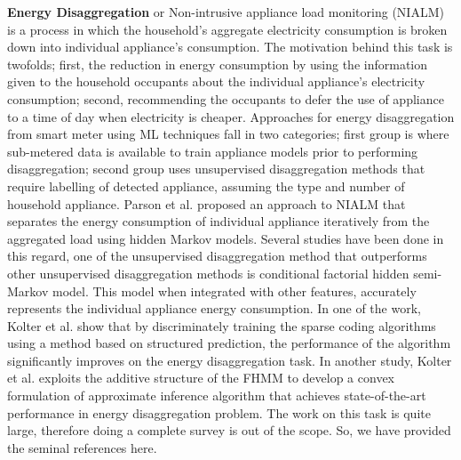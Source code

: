 \documentclass[runningheads,a4paper]{llncs}
\begin{document}

\noindent \textbf{Energy Disaggregation} or Non-intrusive appliance load monitoring (NIALM) is a process in which the household's aggregate electricity consumption is broken down into individual appliance's consumption. The motivation behind this task is twofolds; first, the reduction in energy consumption by using the information given to the household occupants about the individual appliance's electricity consumption; second, recommending the occupants to defer the use of appliance to a time of day when electricity is cheaper. Approaches for energy disaggregation from smart meter using ML techniques fall in two categories; first group is where sub-metered data is available to train appliance models prior to performing disaggregation; second group uses unsupervised disaggregation methods that require labelling of detected appliance, assuming the type and number of household appliance.
Parson et al. \cite{eps272990} proposed an approach to NIALM that separates the energy consumption of individual appliance iteratively from the aggregated load using hidden Markov models. Several studies have been done in this regard, one of the unsupervised disaggregation method \cite{DisaggregationHSMM} that outperforms other unsupervised disaggregation methods is conditional factorial hidden semi-Markov model. This model when integrated with other features, accurately represents the individual appliance energy consumption. In one of the work, Kolter et al. \cite{NIPS2010} show that by discriminately training the sparse coding algorithms using a method based on structured prediction, the performance of the algorithm significantly improves on the energy disaggregation task. In another study, Kolter et al. \cite{KolterJ12} exploits the additive structure of the FHMM to develop a convex formulation of approximate inference algorithm that achieves state-of-the-art performance in energy disaggregation problem. The work on this task is quite large, therefore doing a complete survey is out of the scope. So, we have provided the seminal references here.
\end{document}

